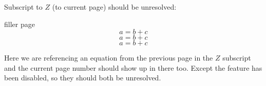 \documentclass{article}
\begin{document}
Subscript to $Z$ (to current page) should be unresolved:
\begin{center}
\end{center}

\clearpage
filler page
\begin{equation}
a=b+c\label{eq1}
\end{equation}
\begin{equation}
a=b+c\label{eq2}
\end{equation}
\begin{equation}
a=b+c\label{eq3}
\end{equation}

\newpage
Here we are referencing an equation from the previous page in the $Z$ subscript and the current page number should show up in there too. Except the feature has been disabled, so they should both be unresolved.

\begin{center}
\end{center}
\end{document}
